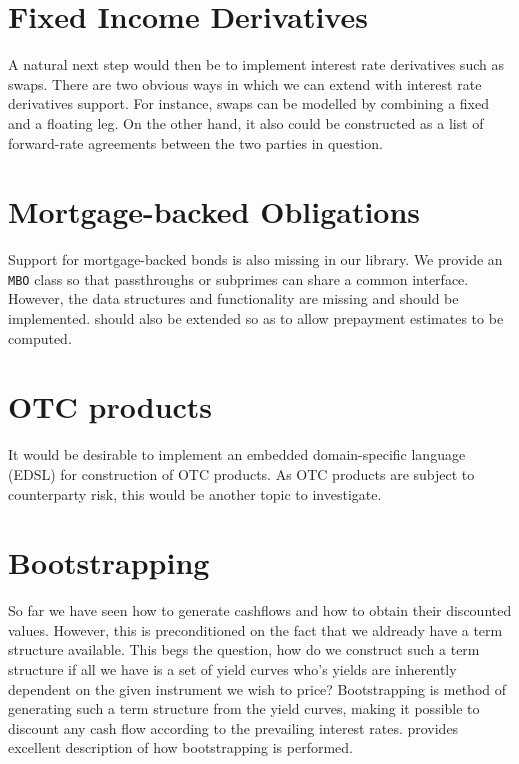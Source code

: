 \section{Fixed Income Derivatives}

A natural next step would then be to implement interest rate derivatives such 
as swaps. There are two obvious ways in which we can extend \hql with interest rate 
derivatives support. For instance, swaps can be modelled by combining a fixed 
and a floating leg. On the other hand, it also could be constructed as a list of 
forward-rate agreements between the two parties in question.\\


\section{Mortgage-backed Obligations}

Support for mortgage-backed bonds is also missing in our library. We provide an 
\texttt{MBO} class so that passthroughs or subprimes can share a common interface.
However, the data structures and functionality are missing and should be 
implemented. \hql should also be extended so as to allow prepayment estimates to
be computed.

\section{OTC products}

It would be desirable to implement an embedded domain-specific 
language (EDSL) for construction of OTC products. As OTC products are
subject to counterparty risk, this would be another topic 
to investigate.

\section{Bootstrapping}

So far we have seen how to generate cashflows and how to obtain their 
discounted values. However, this is preconditioned on the fact that we aldready 
have a term structure available. This begs the question, how do we construct 
such a term structure if all we have is a set of yield curves who's yields 
are inherently dependent on the given instrument we wish to price?
Bootstrapping is method of generating such a term structure from the yield 
curves, making it possible to discount any cash flow according to the 
prevailing interest rates.
\cite{HULL} provides excellent description of how bootstrapping is performed.

